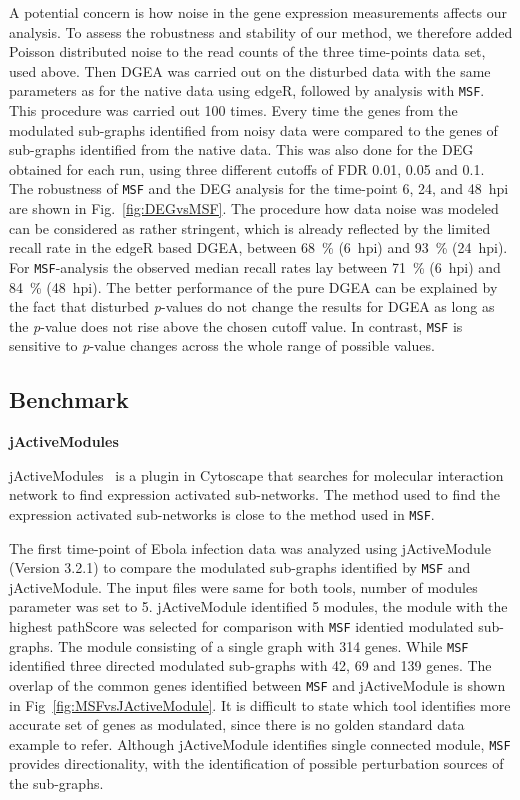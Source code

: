 \documentclass[10pt,a4paper,twocolumn]{article}
\begin{document}
A potential concern is how noise in the gene expression measurements
affects our analysis. To assess the robustness and stability of our method,
we therefore added Poisson distributed noise
to the read counts of the three time-points data set, used above.
Then DGEA was carried out on the disturbed data
with the same parameters as for the native data using edgeR, followed by
analysis with \texttt{MSF}. This procedure was carried out 100 times.
Every time the genes from the modulated sub-graphs identified from noisy
data were compared to the genes of sub-graphs identified from the native
data. This was also done for the DEG obtained for each run, using three different cutoffs of
FDR 0.01, 0.05 and 0.1. The robustness of \texttt{MSF} and the DEG analysis
for the time-point 6, 24, and 48~hpi are shown in
Fig.~\ref{fig:DEGvsMSF}. The procedure how data noise was modeled can be
considered as rather stringent, which is already reflected by the limited
recall rate in the edgeR based DGEA, between 68~\% (6~hpi) and 93~\%
(24~hpi). For \texttt{MSF}-analysis the observed median recall rates lay
between 71~\% (6~hpi) and 84~\% (48~hpi). The better performance of the
pure DGEA can be explained by the fact that disturbed \textit{p}-values do not
change the results for DGEA as long as the \textit{p}-value does not rise above the
chosen cutoff value. In contrast, \texttt{MSF} is sensitive to \textit{p}-value
changes across the whole range of possible values.

\subsection*{Benchmark}


\textbf{jActiveModules}

jActiveModules~\cite{jActiveModules} is a plugin in Cytoscape that searches for molecular interaction network to find expression activated sub-networks. The method used to find the expression activated sub-networks is close to the method used in \texttt{MSF}.

The first time-point of Ebola infection data was analyzed using jActiveModule (Version 3.2.1) to compare the modulated sub-graphs identified by \texttt{MSF} and jActiveModule. The input files were same for both tools, number of modules parameter was set to 5. jActiveModule identified 5 modules, the module with the highest pathScore was selected for comparison with \texttt{MSF} identied modulated sub-graphs. The module consisting of a single graph with 314 genes. While \texttt{MSF} identified three directed modulated sub-graphs with 42, 69 and 139 genes. The overlap of the common genes identified between \texttt{MSF} and jActiveModule is shown in Fig~\ref{fig:MSFvsJActiveModule}. It is difficult to state which tool identifies more accurate set of genes as modulated, since there is no golden standard data example to refer. Although jActiveModule identifies single connected module, \texttt{MSF} provides directionality, with the identification of possible perturbation sources of the sub-graphs.
\end{document}
